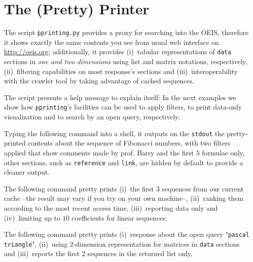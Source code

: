 \section{The (Pretty) Printer}

The script \verb|pprinting.py| provides a proxy for searching into the OEIS,
therefore it shows exactly the same contents you see from usual web interface
on \url{http://oeis.org}; additionally, it provides (i)~tabular representations
of \verb|data| sections in \textit{one and two dimensions} using list and
matrix notations, respectively, (ii)~filtering capabilities on most response's
sections and (iii)~interoperability with the crawler tool by taking advantage of
cached sequences.

The script presents a help message to explain itself:
 In the next examples
we show how \verb|pprinting|'s facilities can be used to apply filters, to
print data-only visualization and to search by an open query, respectively.

\begin{example} Typing the following command into a shell, it outputs
on the \verb|stdout| the pretty-printed contents about the sequence of
Fibonacci numbers, with two filters applied that show comments made by
prof. Barry and the first $5$ formulae only,
other sections, such as \verb|reference| and \verb|link|, are hidden by
default to provide a cleaner output.
\end{example}

\begin{example}
The following command pretty prints (i)~the first 3 sequences from our current
cache --the result may vary if you try on your own machine--, (ii)~ranking them
according to the most recent access time, (iii)~reporting data only and
(iv)~limiting up to $10$ coefficients for linear sequences:
\end{example}

\begin{example}
The following command pretty prints (i)~response about the open query
"\verb|pascal triangle|", (ii)~using $2$-dimension representation for matrices
in \verb|data| sections and (iii)~reports the first $2$ sequences in the
returned list only,
\end{example}

